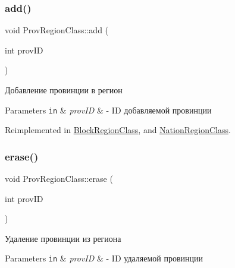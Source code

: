 \subsubsection{\texorpdfstring{add()}{add()}}
{\footnotesize\ttfamily void Prov\+Region\+Class\+::add (\begin{DoxyParamCaption}\item[{int}]{prov\+ID }\end{DoxyParamCaption})\hspace{0.3cm}{\ttfamily [virtual]}}



Добавление провинции в регион 


\begin{DoxyParams}[1]{Parameters}
\mbox{\tt in}  & {\em prov\+ID} & -\/ ID добавляемой провинции \\
\hline
\end{DoxyParams}


Reimplemented in \hyperlink{class_block_region_class_a95052be1d1d550dab72197af99f4d4e1}{Block\+Region\+Class}, and \hyperlink{class_nation_region_class_ab27cc488b934845a37d02186c6b4894e}{Nation\+Region\+Class}.

\mbox{\label{class_prov_region_class_ad28dbe98716517339922d6c4e0433611}} 
\subsubsection{\texorpdfstring{erase()}{erase()}}
{\footnotesize\ttfamily void Prov\+Region\+Class\+::erase (\begin{DoxyParamCaption}\item[{int}]{prov\+ID }\end{DoxyParamCaption})\hspace{0.3cm}{\ttfamily [virtual]}}



Удаление провинции из региона 


\begin{DoxyParams}[1]{Parameters}
\mbox{\tt in}  & {\em prov\+ID} & -\/ ID удаляемой провинции \\
\hline
\end{DoxyParams}
\mbox{\label{class_prov_region_class_ab6f83c85a913b7f9ac3f6839b3386793}} 
